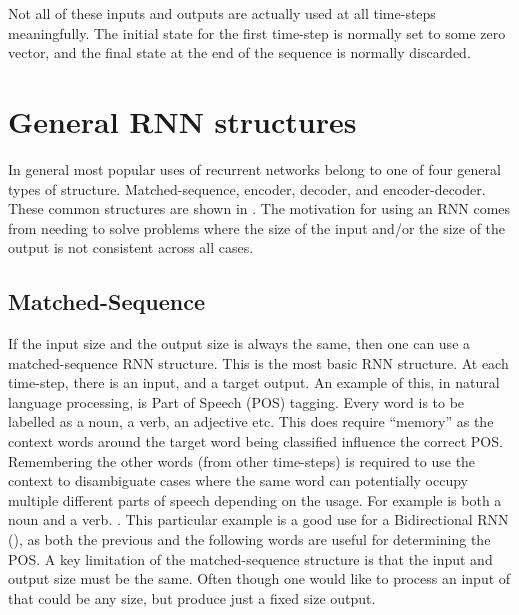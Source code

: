 \documentclass[12pt,parskip]{komatufte}
\begin{document}
Not all of these inputs and outputs are actually used at all time-steps meaningfully.
The initial state for the first time-step is normally set to some zero vector,
and the final state at the end of the sequence is normally discarded.


\section{General RNN structures}
In general most popular uses of recurrent networks belong to one of four general types of structure.
Matched-sequence, encoder, decoder, and encoder-decoder.
These common structures are shown in .
The motivation for using an RNN comes from needing to solve problems where the size of the input and/or the size of the output is not consistent across all cases.

\subsection{Matched-Sequence}
If the input size and the output size is always the same, then one can use a matched-sequence RNN structure.
This is the most basic RNN structure.
At each time-step, there is an input, and a target output.
An example of this, in natural language processing, is Part of Speech (POS) tagging.
Every word is to be labelled as a noun, a verb, an adjective etc.
This does require ``memory'' as the context words around the target word being classified influence the correct POS.
Remembering the other words (from other time-steps) is required to use the context to disambiguate cases where the same word can potentially occupy multiple different parts of speech depending on the usage.
For example  is both a noun and a verb.%
.%
This particular example is a good use for a Bidirectional RNN (), as both the previous and the following words are useful for determining the POS.
A key limitation of the matched-sequence structure is that the input and output size must be the same.
Often though one would like to process an input of that could be any size, but produce just a fixed size output.
\end{document}

